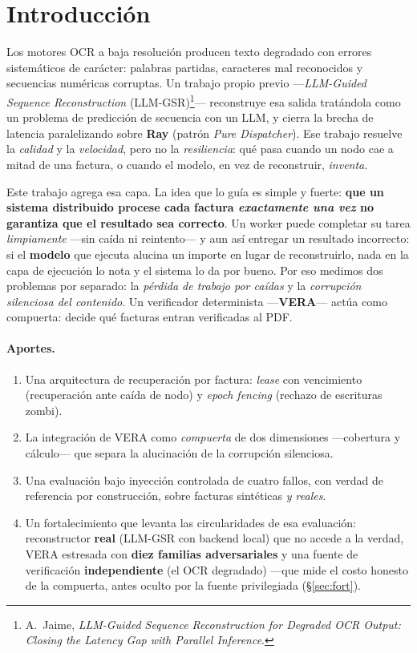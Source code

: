 \section{Introducción}

Los motores OCR a baja resolución producen texto degradado con errores sistemáticos de
carácter: palabras partidas, caracteres mal reconocidos y secuencias numéricas corruptas. Un
trabajo propio previo ---\emph{LLM-Guided Sequence Reconstruction} (LLM-GSR)\footnote{A.\
Jaime, \emph{LLM-Guided Sequence Reconstruction for Degraded OCR Output: Closing the Latency
Gap with Parallel Inference}.}--- reconstruye esa salida tratándola como un problema de
predicción de secuencia con un LLM, y cierra la brecha de latencia paralelizando sobre
\textbf{Ray} (patrón \emph{Pure Dispatcher}). Ese trabajo resuelve la \emph{calidad} y la
\emph{velocidad}, pero no la \emph{resiliencia}: qué pasa cuando un nodo cae a mitad de una
factura, o cuando el modelo, en vez de reconstruir, \emph{inventa}.

Este trabajo agrega esa capa. La idea que lo guía es simple y fuerte: \textbf{que un sistema
distribuido procese cada factura \emph{exactamente una vez} no garantiza que el resultado sea
correcto}. Un worker puede completar su tarea \emph{limpiamente} ---sin caída ni
reintento--- y aun así entregar un resultado incorrecto: si el \textbf{modelo} que ejecuta
alucina un importe en lugar de reconstruirlo, nada en la capa de ejecución lo nota y el
sistema lo da por bueno. Por eso medimos dos problemas por separado: la \emph{pérdida de trabajo por
caídas} y la \emph{corrupción silenciosa del contenido}. Un verificador determinista
---\textbf{VERA}--- actúa como compuerta: decide qué facturas entran verificadas al PDF.

\paragraph{Aportes.}
\begin{enumerate}[leftmargin=1.4em,itemsep=1pt]
  \item Una arquitectura de recuperación por factura: \emph{lease} con vencimiento
    (recuperación ante caída de nodo) y \emph{epoch fencing} (rechazo de escrituras zombi).
  \item La integración de VERA como \emph{compuerta} de dos dimensiones ---cobertura y
    cálculo--- que separa la alucinación de la corrupción silenciosa.
  \item Una evaluación bajo inyección controlada de cuatro fallos, con verdad de referencia
    por construcción, sobre facturas sintéticas \emph{y reales}.
  \item Un fortalecimiento que levanta las circularidades de esa evaluación: reconstructor
    \textbf{real} (LLM-GSR con backend local) que no accede a la verdad, VERA estresada con
    \textbf{diez familias adversariales} y una fuente de verificación \textbf{independiente}
    (el OCR degradado) ---que mide el costo honesto de la compuerta, antes oculto por la
    fuente privilegiada (§\ref{sec:fort}).
\end{enumerate}

